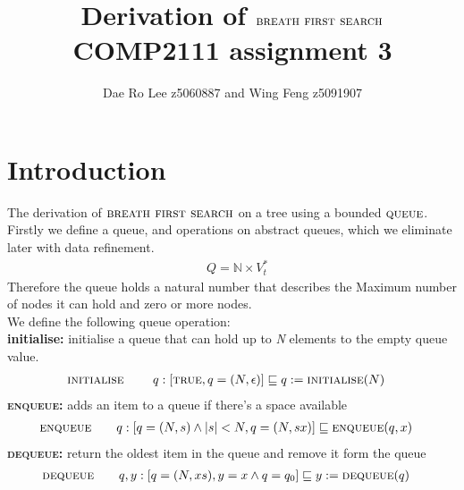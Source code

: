 \documentclass[headings=small,a4paper,12pt]{scrartcl}
\title{Derivation of $\bfs$\\
\large COMP2111 assignment 3}
\author{Dae Ro Lee z5060887 and Wing Feng z5091907}
\newcommand{\bfs}{\textsc{breath first search}\xspace}
\newcommand{\qu}{\textsc{queue}\xspace}
\newcommand{\enq}{\textsc{enqueue}\xspace}
\newcommand{\deq}{\textsc{dequeue}\xspace}
\newcommand{\ini}{\textsc{initialise}\xspace}
\begin{document}
\maketitle
%
\section{Introduction}
\label{sec:introduction}
The derivation of $\bfs$ on a tree using a bounded $\qu$.\\ 
%
Firstly we define a queue, and operations on abstract queues, which we eliminate later with data refinement.
\begin{align*}
    &Q= \mathbb{N}\times V^*_t
\end{align*}
Therefore the queue holds a natural number that describes the Maximum number of nodes it can hold and zero or more nodes.\\
We define the following queue operation:\\
\textbf{initialise:} initialise a queue that can hold up to \textit{N} elements to the empty queue value.
\begin{align*}
  &\ini\qquad~q :[\True, q = (N,\epsilon)] \isrefinedby q\Ass\ini(N)
\end{align*}
\textbf{\enq:} adds an item to a queue if there's a space available 
\begin{align*}
  &\enq\qquad q:[q=(N,s)\And |s| < N, q=(N,sx)]\isrefinedby \enq(q,x)
\end{align*}
\textbf{\deq:} return the oldest item in the queue and remove it form the queue\\
\begin{align*}
  &\deq\qquad q,y:[q = (N,xs), y = x \And q = q_0] \isrefinedby y \Ass \deq(q) 
\end{align*}
%
\end{document}
